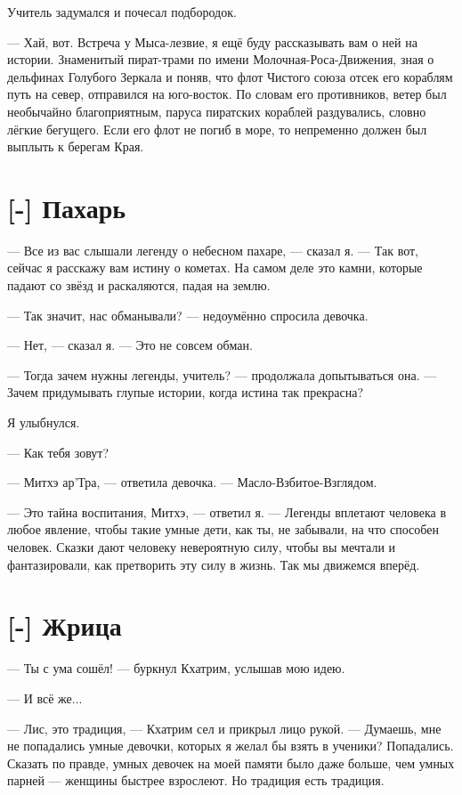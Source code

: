 Учитель задумался и почесал подбородок.

--- Хай, вот.
Встреча у Мыса-лезвие, я ещё буду рассказывать вам о ней на истории.
Знаменитый пират-трами по имени Молочная-Роса-Движения, зная о дельфинах Голубого Зеркала и поняв, что флот Чистого союза отсек его кораблям путь на север, отправился на юго-восток.
По словам его противников, ветер был необычайно благоприятным, паруса пиратских кораблей раздувались, словно лёгкие бегущего.
Если его флот не погиб в море, то непременно должен был выплыть к берегам Края.

\section{[-] Пахарь}

\textspace

--- Все из вас слышали легенду о небесном пахаре, --- сказал я.
--- Так вот, сейчас я расскажу вам истину о кометах.
На самом деле это камни, которые падают со звёзд и раскаляются, падая на землю.

--- Так значит, нас обманывали? --- недоумённо спросила девочка.

--- Нет, --- сказал я.
--- Это не совсем обман.

--- Тогда зачем нужны легенды, учитель? --- продолжала допытываться она.
--- Зачем придумывать глупые истории, когда истина так прекрасна?

Я улыбнулся.

--- Как тебя зовут?

--- Митхэ ар'Тра, --- ответила девочка.
--- Масло-Взбитое-Взглядом.

--- Это тайна воспитания, Митхэ, --- ответил я.
--- Легенды вплетают человека в любое явление, чтобы такие умные дети, как ты, не забывали, на что способен человек.
Сказки дают человеку невероятную силу, чтобы вы мечтали и фантазировали, как претворить эту силу в жизнь.
Так мы движемся вперёд.

\section{[-] Жрица}

--- Ты с ума сошёл! --- буркнул Кхатрим, услышав мою идею.

--- И всё же...

--- Лис, это традиция, --- Кхатрим сел и прикрыл лицо рукой.
--- Думаешь, мне не попадались умные девочки, которых я желал бы взять в ученики?
Попадались.
Сказать по правде, умных девочек на моей памяти было даже больше, чем умных парней --- женщины быстрее взрослеют.
Но традиция есть традиция.

